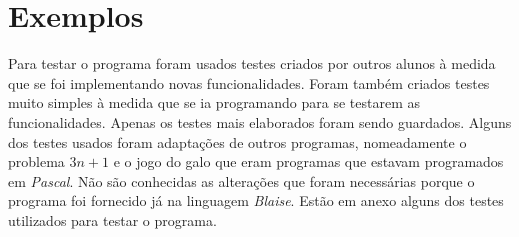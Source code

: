 \chapter{Exemplos}

Para testar o programa foram usados testes criados por outros alunos à medida 
que se foi implementando novas funcionalidades. Foram também criados testes 
muito simples à medida que se ia programando para se testarem as 
funcionalidades. Apenas os testes mais elaborados foram sendo guardados. 
Alguns dos testes usados foram adaptações de outros programas, nomeadamente 
o problema $3n+1$ e o jogo do galo que eram programas que estavam programados 
em \emph{Pascal}. Não são conhecidas as alterações que foram necessárias porque 
o programa foi fornecido já na linguagem \emph {Blaise}. Estão em anexo alguns 
dos testes utilizados para testar o programa.

